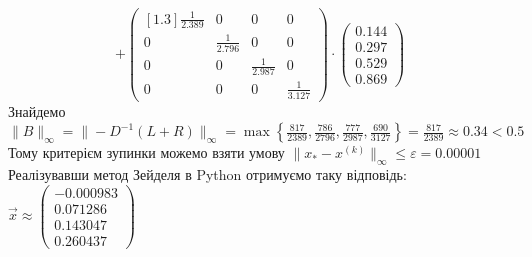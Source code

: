 \documentclass[14 pt]{extarticle}
\begin{document}
{$$    + 
    \begin{pmatrix}[1.3]
        \frac{1}{2.389} & 0 & 0 & 0 \\ 
        0 & \frac{1}{2.796} & 0 & 0 \\ 
        0 &  0 & \frac{1}{2.987} & 0 \\ 
        0 & 0 & 0 &\frac{1}{3.127 }
    \end{pmatrix}
    \cdot 
    \begin{pmatrix}
        0.144 \\ 
        0.297 \\ 
        0.529 \\ 
        0.869
    \end{pmatrix}
    $$
    Знайдемо $\|B\|_{ \infty } = \|-D^{-1} (L + R)\|_{ \infty} = 
    \max{\left\{ \frac{817}{2389}, \frac{786}{2796}, \frac{777}{2987}, \frac{690}{3127} \right\}} 
    = \frac{817}{2389} \approx 0.34 < 0.5 $ \\
    Тому критерієм зупинки можемо взяти умову $\| x_* - x^{(k)} \|_{ \infty } \leq \varepsilon = 0.00001 $ \\ 
    Реалізувавши метод Зейделя в Python отримуємо таку відповідь: 
    $\vec{x} \approx \begin{pmatrix}
        -0.000983 \\ 
        0.071286 \\ 
        0.143047 \\
        0.260437
    \end{pmatrix}$  
    
}
\end{document}
